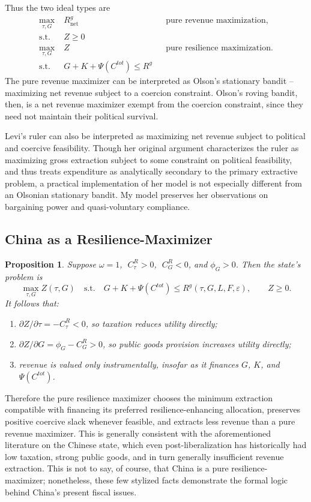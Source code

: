 \documentclass[12pt]{article}
\newtheorem{proposition}{Proposition}
\begin{document}
Thus the two ideal types are
\begin{align*}
\max_{\tau, G} \;& R^g_{\text{net}} && \text{pure revenue maximization},\\
\text{s.t.} \;& Z \ge 0 \\
\max_{\tau, G} \;& Z && \text{pure resilience maximization}. \\
\text{s.t.} \;& G + K + \Psi(C^{tot}) \le R^g
\end{align*}
The pure revenue maximizer can be interpreted as Olson's stationary bandit -- maximizing net revenue subject to a coercion constraint. Olson's roving bandit, then, is a net revenue maximizer exempt from the coercion constraint, since they need not maintain their political survival.

Levi’s ruler can also be interpreted as maximizing net revenue subject to political and coercive feasibility. Though her original argument characterizes the ruler as maximizing gross extraction subject to some constraint on political feasibility, and thus treats expenditure as analytically secondary to the primary extractive problem, a practical implementation of her model is not especially different from an Olsonian stationary bandit. My model preserves her observations on bargaining power and quasi-voluntary compliance.

\subsection{China as a Resilience-Maximizer}

\begin{proposition}
Suppose $\omega=1$, $\;C^R_\tau>0$, $\;C^R_G<0$, and $\phi_G>0$. Then the state's problem is
\[
\max_{\tau,G} Z(\tau,G)
\quad \text{s.t.} \quad
G+K+\Psi(C^{tot}) \le R^g(\tau,G,L,F,\varepsilon), \qquad Z\ge 0.
\]
It follows that:
\begin{enumerate}
    \item $\partial Z/\partial \tau = -C^R_\tau <0$, so taxation reduces utility directly;
    \item $\partial Z/\partial G = \phi_G - C^R_G >0$, so public goods provision increases utility directly;
    \item revenue is valued only instrumentally, insofar as it finances $G$, $K$, and $\Psi(C^{tot})$.
\end{enumerate}\label{proposition: comparativestats}
\end{proposition}

Therefore the pure resilience maximizer chooses the minimum extraction compatible with financing its preferred resilience-enhancing allocation, preserves positive coercive slack whenever feasible, and extracts less revenue than a pure revenue maximizer. This is generally consistent with the aforementioned literature on the Chinese state, which even post-liberalization has historically had low taxation, strong public goods, and in turn generally insufficient revenue extraction. This is not to say, of course, that China is a pure resilience-maximizer; nonetheless, these few stylized facts demonstrate the formal logic behind China's present fiscal issues.
\end{document}
